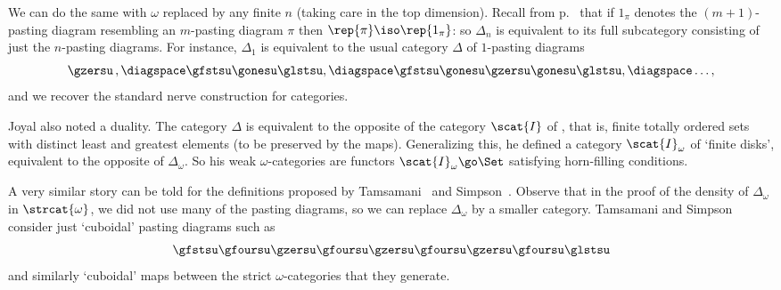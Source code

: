 We can do the same with $\omega$ replaced by any finite $n$ (taking care in
the top%
%
%
dimension).  Recall from p.~\pageref{p:degen-rep} that if $1_\pi$
denotes the $(m+1)$-pasting diagram resembling an $m$-pasting diagram $\pi$
then $\rep{\pi} \iso \rep{1_\pi}$: so $\Delta_n$ is equivalent to its full
subcategory consisting of just the $n$-pasting diagrams.  For instance,
$\Delta_1$ is equivalent to the usual category $\Delta$ of $1$-pasting
diagrams
\[
\gzersu\,,
\diagspace
\gfstsu\gonesu\glstsu,
\diagspace
\gfstsu\gonesu\gzersu\gonesu\glstsu, 
\diagspace
\ldots,
\]
and we recover the standard nerve construction for categories.  

Joyal also noted a duality.%
%
%
 The category $\Delta$ is equivalent to
the opposite of the category $\scat{I}$ of ,
that is, finite totally ordered sets with distinct least and greatest
elements (to be preserved by the maps).  Generalizing this, he defined a
category $\scat{I}_\omega$ of `finite disks',%
%
%
equivalent to the opposite of
$\Delta_\omega$.  
So his weak $\omega$-categories are functors $\scat{I}_\omega \go \Set$
satisfying horn-filling conditions.%
%
%
%
%
%




%
%
%
%
%
%
%
%
%
%

A very similar story can be told for the definitions proposed by
Tamsamani~\cite{TamSNN} and Simpson~\cite{SimCMS}.  Observe that in the
proof of the density of $\Delta_\omega$ in $\strcat{\omega}$, we did not
use many of the pasting diagrams, so we can replace $\Delta_\omega$ by a
smaller category.  Tamsamani and Simpson consider just `cuboidal'%
%
%
pasting
diagrams such as
\[
\gfstsu\gfoursu\gzersu\gfoursu\gzersu\gfoursu\gzersu\gfoursu\glstsu
\]
and similarly `cuboidal' maps between the strict $\omega$-categories that
they generate.


